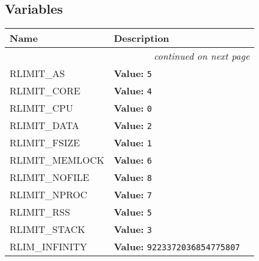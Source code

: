 
  \subsection{Variables}

    \vspace{-1cm}
\hspace{\varindent}\begin{longtable}{|p{\varnamewidth}|p{\vardescrwidth}|l}
\cline{1-2}
\cline{1-2} \centering \textbf{Name} & \centering \textbf{Description}& \\
\cline{1-2}
\endhead\cline{1-2}\multicolumn{3}{r}{\small\textit{continued on next page}}\\\endfoot\cline{1-2}
\endlastfoot\raggedright R\-L\-I\-M\-I\-T\-\_\-A\-S\- & \raggedright \textbf{Value:} 
{\tt 5}&\\
\cline{1-2}
\raggedright R\-L\-I\-M\-I\-T\-\_\-C\-O\-R\-E\- & \raggedright \textbf{Value:} 
{\tt 4}&\\
\cline{1-2}
\raggedright R\-L\-I\-M\-I\-T\-\_\-C\-P\-U\- & \raggedright \textbf{Value:} 
{\tt 0}&\\
\cline{1-2}
\raggedright R\-L\-I\-M\-I\-T\-\_\-D\-A\-T\-A\- & \raggedright \textbf{Value:} 
{\tt 2}&\\
\cline{1-2}
\raggedright R\-L\-I\-M\-I\-T\-\_\-F\-S\-I\-Z\-E\- & \raggedright \textbf{Value:} 
{\tt 1}&\\
\cline{1-2}
\raggedright R\-L\-I\-M\-I\-T\-\_\-M\-E\-M\-L\-O\-C\-K\- & \raggedright \textbf{Value:} 
{\tt 6}&\\
\cline{1-2}
\raggedright R\-L\-I\-M\-I\-T\-\_\-N\-O\-F\-I\-L\-E\- & \raggedright \textbf{Value:} 
{\tt 8}&\\
\cline{1-2}
\raggedright R\-L\-I\-M\-I\-T\-\_\-N\-P\-R\-O\-C\- & \raggedright \textbf{Value:} 
{\tt 7}&\\
\cline{1-2}
\raggedright R\-L\-I\-M\-I\-T\-\_\-R\-S\-S\- & \raggedright \textbf{Value:} 
{\tt 5}&\\
\cline{1-2}
\raggedright R\-L\-I\-M\-I\-T\-\_\-S\-T\-A\-C\-K\- & \raggedright \textbf{Value:} 
{\tt 3}&\\
\cline{1-2}
\raggedright R\-L\-I\-M\-\_\-I\-N\-F\-I\-N\-I\-T\-Y\- & \raggedright \textbf{Value:} 
{\tt 9223372036854775807}&\\
\cline{1-2}

\end{longtable}
